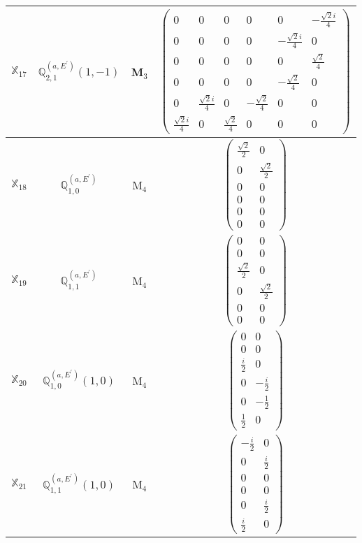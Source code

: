 \documentclass[fleqn,10pt,landscape]{article}
\begin{document}
\begin{itemize}
\begin{center}
\begin{longtable}{c|c|c|c}
$ \mathbb{X}_{17} $ & $\mathbb{Q}_{2,1}^{(a,E^{\prime})}(1,-1)$ & M$_{3}$ & $\begin{pmatrix} 0 & 0 & 0 & 0 & 0 & - \frac{\sqrt{2} i}{4} \\ 0 & 0 & 0 & 0 & - \frac{\sqrt{2} i}{4} & 0 \\ 0 & 0 & 0 & 0 & 0 & \frac{\sqrt{2}}{4} \\ 0 & 0 & 0 & 0 & - \frac{\sqrt{2}}{4} & 0 \\ 0 & \frac{\sqrt{2} i}{4} & 0 & - \frac{\sqrt{2}}{4} & 0 & 0 \\ \frac{\sqrt{2} i}{4} & 0 & \frac{\sqrt{2}}{4} & 0 & 0 & 0 \end{pmatrix}$ \\ \hline
$ \mathbb{X}_{18} $ & $\mathbb{Q}_{1,0}^{(a,E^{\prime})}$ & M$_{4}$ & $\begin{pmatrix} \frac{\sqrt{2}}{2} & 0 \\ 0 & \frac{\sqrt{2}}{2} \\ 0 & 0 \\ 0 & 0 \\ 0 & 0 \\ 0 & 0 \end{pmatrix}$ \\
$ \mathbb{X}_{19} $ & $\mathbb{Q}_{1,1}^{(a,E^{\prime})}$ & M$_{4}$ & $\begin{pmatrix} 0 & 0 \\ 0 & 0 \\ \frac{\sqrt{2}}{2} & 0 \\ 0 & \frac{\sqrt{2}}{2} \\ 0 & 0 \\ 0 & 0 \end{pmatrix}$ \\
$ \mathbb{X}_{20} $ & $\mathbb{Q}_{1,0}^{(a,E^{\prime})}(1,0)$ & M$_{4}$ & $\begin{pmatrix} 0 & 0 \\ 0 & 0 \\ \frac{i}{2} & 0 \\ 0 & - \frac{i}{2} \\ 0 & - \frac{1}{2} \\ \frac{1}{2} & 0 \end{pmatrix}$ \\
$ \mathbb{X}_{21} $ & $\mathbb{Q}_{1,1}^{(a,E^{\prime})}(1,0)$ & M$_{4}$ & $\begin{pmatrix} - \frac{i}{2} & 0 \\ 0 & \frac{i}{2} \\ 0 & 0 \\ 0 & 0 \\ 0 & \frac{i}{2} \\ \frac{i}{2} & 0 \end{pmatrix}$ \\

\end{longtable}
\end{center}
\end{itemize}
\end{document}
